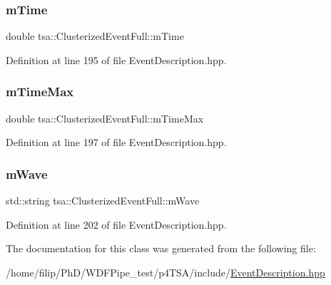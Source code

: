 \subsubsection{\texorpdfstring{m\+Time}{mTime}}
{\footnotesize\ttfamily double tsa\+::\+Clusterized\+Event\+Full\+::m\+Time}



Definition at line 195 of file Event\+Description.\+hpp.

\mbox{\label{classtsa_1_1_clusterized_event_full_ab5bf41bc3aee190a3bacbcf0014151e4}} 
\subsubsection{\texorpdfstring{m\+Time\+Max}{mTimeMax}}
{\footnotesize\ttfamily double tsa\+::\+Clusterized\+Event\+Full\+::m\+Time\+Max}



Definition at line 197 of file Event\+Description.\+hpp.

\mbox{\label{classtsa_1_1_clusterized_event_full_ad3d7bb3e8a5e4ebfea14045ed7281c99}} 
\subsubsection{\texorpdfstring{m\+Wave}{mWave}}
{\footnotesize\ttfamily std\+::string tsa\+::\+Clusterized\+Event\+Full\+::m\+Wave}



Definition at line 202 of file Event\+Description.\+hpp.



The documentation for this class was generated from the following file\+:\begin{DoxyCompactItemize}
\item 
/home/filip/\+Ph\+D/\+W\+D\+F\+Pipe\+\_\+test/p4\+T\+S\+A/include/\hyperlink{_event_description_8hpp}{Event\+Description.\+hpp}\end{DoxyCompactItemize}

